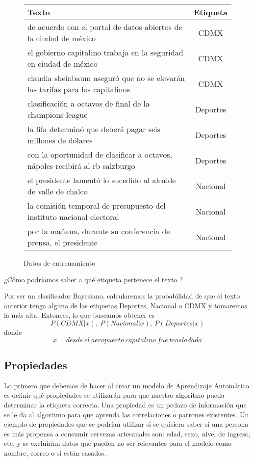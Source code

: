 \begin{figure}[H]
  \begin{center}
    \begin{tabular}{ l | c }
      Texto & Etiqueta \\ \hline
      de acuerdo con el portal de datos abiertos de la ciudad de méxico & CDMX  \\ \hline
      el gobierno capitalino trabaja en la seguridad en ciudad de méxico & CDMX  \\ \hline
      claudia sheinbaum aseguró que no se elevarán las tarifas para los capitalinos & CDMX  \\ \hline
      clasificación a octavos de final de la champions league & Deportes\\ \hline
      la fifa determinó que deberá pagar seis millones de dólares & Deportes  \\ \hline
      con la oportunidad de clasificar a octavos, nápoles recibirá al rb salzburgo & Deportes  \\ \hline
      el presidente lamentó lo sucedido al alcalde de valle de chalco & Nacional  \\ \hline
      la comisión temporal de presupuesto del instituto nacional electoral & Nacional  \\ \hline
      por la mañana, durante su conferencia de prensa, el presidente & Nacional  \\
    \end{tabular}
  \end{center}
  \caption{Datos de entrenamiento}
\end{figure}

¿Cómo podríamos saber a qué etiqueta pertenece el texto ?

Por ser un clasificador Bayesiano, calcularemos la probabilidad de que el texto anterior tenga alguna de las etiquetas Deportes, Nacional o CDMX y tomaremos la más alta. Entonces, lo que buscamos obtener es
\[P( CDMX | x ), \ P( Nacional | x ), \ P( Deportes | x )\]
donde
\[x = desde \ el \ aeropuerto \ capitalino \ fue \ trasladada \]

\subsection{Propiedades}

Lo primero que debemos de hacer al crear un modelo de Aprendizaje Automático es definir qué propiedades se utilizarán para que nuestro algoritmo pueda determinar la etiqueta correcta. Una propiedad es un pedazo de información que se le da al algoritmo para que aprenda las correlaciones o patrones existentes. Un ejemplo de propiedades que se podrían utilizar si se quisiera saber si una persona es más propensa a consumir cervezas artesanales son: edad, sexo, nivel de ingreso, etc. y se excluirían datos que pueden no ser relevantes para el modelo como nombre, correo o si están casados.

